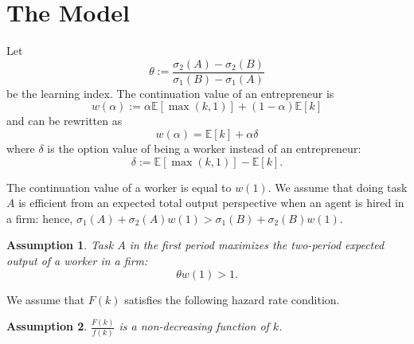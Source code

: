 \documentclass[12pt]{article}
\newtheorem{assumption}{Assumption}
\newcommand{\E}[1]{\mathbb E[#1]}
\begin{document}
 
\title{} 
\author{Patrick Legros} 
\date{\today} 
\maketitle

\section{The Model}
Let 
%
\begin{equation}\label{learning}
    \theta :=\frac{\sigma_2(A)-\sigma_2(B)}{\sigma_1(B)-\sigma_1(A)}   
\end{equation}
%
be the learning index.  The continuation value of an entrepreneur is 
%
\begin{equation*}
    w(\alpha):= \alpha \E{\max(k,1)} +(1-\alpha)\E {k}   
\end{equation*}
%
and can be rewritten as 
%
\begin{equation}\label{continuation_value}
w(\alpha)=\E k +\alpha \delta 
\end{equation}
%
where $\delta$ is the option value of being a worker instead of an entrepreneur:
\begin{equation}\label{option-value}
    \delta:=\E{\max(k,1)} -\E {k}.
\end{equation}

The continuation value of a worker is equal to $w(1)$.
%
We assume that doing task $A$ is efficient from an expected total output perspective when an agent is hired in a firm: hence, $\sigma_1(A)+\sigma_2(A)w(1)> \sigma_1(B)+\sigma_2(B)w(1)$.

\begin{assumption}\label{A-efficient}
    Task $A$ in the first period maximizes the two-period expected output of a worker in a firm:
    \[
  \theta  w(1)>1.  
    \]
\end{assumption}
%
We assume that $F(k)$ satisfies the following hazard rate condition.
\begin{assumption}\label{ass:hazard-rate}
    $\frac{F(k)}{f(k)}$ is a non-decreasing function of $k$.
\end{assumption}

%
\end{document}
